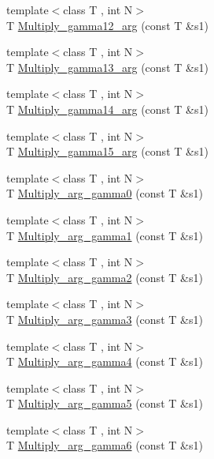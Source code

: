 \begin{DoxyCompactItemize}
\item 
{\footnotesize template$<$class T , int N$>$ }\\T \mbox{\hyperlink{namespaceENSEM_abe630fefe9bf4d743519870f8da7cd57}{Multiply\+\_\+gamma12\+\_\+arg}} (const T \&s1)
\item 
{\footnotesize template$<$class T , int N$>$ }\\T \mbox{\hyperlink{namespaceENSEM_ada6a9330c7a86fb18f76313b549d202c}{Multiply\+\_\+gamma13\+\_\+arg}} (const T \&s1)
\item 
{\footnotesize template$<$class T , int N$>$ }\\T \mbox{\hyperlink{namespaceENSEM_a51519aac850a9e91ae4b8290df023859}{Multiply\+\_\+gamma14\+\_\+arg}} (const T \&s1)
\item 
{\footnotesize template$<$class T , int N$>$ }\\T \mbox{\hyperlink{namespaceENSEM_ad162069adba3b41fb86d8ff508380d57}{Multiply\+\_\+gamma15\+\_\+arg}} (const T \&s1)
\item 
{\footnotesize template$<$class T , int N$>$ }\\T \mbox{\hyperlink{namespaceENSEM_ae70068bb9b31b907021cb38c9353131f}{Multiply\+\_\+arg\+\_\+gamma0}} (const T \&s1)
\item 
{\footnotesize template$<$class T , int N$>$ }\\T \mbox{\hyperlink{namespaceENSEM_a60ccb9e2fa020c162e6bb275d0f3571b}{Multiply\+\_\+arg\+\_\+gamma1}} (const T \&s1)
\item 
{\footnotesize template$<$class T , int N$>$ }\\T \mbox{\hyperlink{namespaceENSEM_a04d25124568b0f6dfc2f0cfe608d8143}{Multiply\+\_\+arg\+\_\+gamma2}} (const T \&s1)
\item 
{\footnotesize template$<$class T , int N$>$ }\\T \mbox{\hyperlink{namespaceENSEM_ac8f8de88f467fc3d60ac735a9fc90e08}{Multiply\+\_\+arg\+\_\+gamma3}} (const T \&s1)
\item 
{\footnotesize template$<$class T , int N$>$ }\\T \mbox{\hyperlink{namespaceENSEM_a85441f4376b87e5b81716bcda5cf3e6a}{Multiply\+\_\+arg\+\_\+gamma4}} (const T \&s1)
\item 
{\footnotesize template$<$class T , int N$>$ }\\T \mbox{\hyperlink{namespaceENSEM_a8e465294989989eb52731a497103b658}{Multiply\+\_\+arg\+\_\+gamma5}} (const T \&s1)
\item 
{\footnotesize template$<$class T , int N$>$ }\\T \mbox{\hyperlink{namespaceENSEM_a4ddbb1d4cde2c8657237efcf3b668f48}{Multiply\+\_\+arg\+\_\+gamma6}} (const T \&s1)

\end{DoxyCompactItemize}
